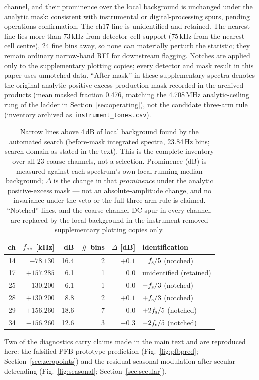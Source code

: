 channel, and their prominence over the local background is unchanged
under the analytic mask: consistent with instrumental or
digital-processing spurs, pending operations confirmation. The ch17
line is unidentified and retained. The nearest line lies more than
73\,kHz from detector-cell support (75\,kHz from the nearest cell
centre), 24 fine bins away, so none can materially perturb the
statistic; they remain ordinary narrow-band RFI for downstream
flagging. Notches are applied only to the supplementary plotting
copies; every detector and mask result in this paper uses unnotched
data. ``After mask'' in these supplementary spectra denotes the
original analytic positive-excess production mask recorded in the
archived products (mean masked fraction 0.476, matching the 4.708\,MHz
analytic-ceiling rung of the ladder in Section~\ref{sec:operating}),
not the candidate three-arm rule
(inventory archived as \texttt{instrument\_tones.csv}).

\begin{table}[b]
  \centering
  \caption{Narrow lines above 4\,dB of local background found by the
  automated search (before-mask integrated spectra, 23.84\,Hz bins;
  search domain as stated in the text). This is the complete inventory
  over all 23 coarse channels, not a selection. Prominence (dB) is measured
  against each spectrum's own local running-median background;
  $\Delta$ is the change in that \emph{prominence} under the analytic
  positive-excess mask --- not an absolute-amplitude change, and no
  invariance under the veto or the full three-arm rule is claimed.
  ``Notched'' lines, and the coarse-channel DC spur in every channel,
  are replaced by the local background in the instrument-removed
  supplementary plotting copies only.}
  \label{tab:spurs}
  \begin{tabular}{rrrrrl}
    \hline
    ch & $f_{\rm bb}$ [kHz] & dB & \# bins & $\Delta$ [dB] &
    identification \\
    \hline
    14 & $-78.130$  & 16.4 & 2 & $+0.1$ & $-f_{\rm s}/5$ (notched) \\
    17 & $+157.285$ & 6.1  & 1 & $0.0$  & unidentified (retained) \\
    25 & $-130.200$ & 6.1  & 1 & $0.0$  & $-f_{\rm s}/3$ (notched) \\
    28 & $+130.200$ & 8.8  & 2 & $+0.1$ & $+f_{\rm s}/3$ (notched) \\
    29 & $+156.260$ & 18.6 & 7 & $0.0$  & $+2f_{\rm s}/5$ (notched) \\
    34 & $-156.260$ & 12.6 & 3 & $-0.3$ & $-2f_{\rm s}/5$ (notched) \\
    \hline
  \end{tabular}
\end{table}
Two of the diagnostics carry claims made in the main text and are
reproduced here: the falsified PFB-prototype prediction
(Fig.~\ref{fig:pfbpred}; Section~\ref{sec:zeropoints}) and the residual
seasonal modulation after secular detrending (Fig.~\ref{fig:seasonal};
Section~\ref{sec:secular}).

